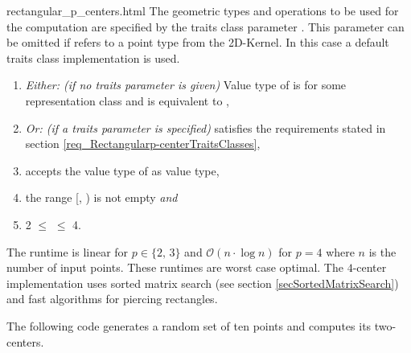 \begin{ccHtmlClassFile}{rectangular_p_centers.html}
  The geometric types and operations to be used for the computation
  are specified by the traits class parameter . This parameter
  can be omitted if  refers to a point type from
  the 2D-Kernel. In this case a default traits class implementation is
  used.

  \begin{enumerate}
  \item \textit{Either: (if no traits parameter is given)} Value type
    of  is  for some
    representation class  and  is equivalent to
    ,
  \item \textit{Or: (if a traits parameter is specified)} 
    satisfies the requirements stated in section
    \ref{req_Rectangularp-centerTraitsClasses},
  \item {} accepts the value type of
     as value type,
  \item the range [, ) is not empty \textit{and}
  \item 2 $\le$  $\le$ 4.
  \end{enumerate}
  
  \ccImplementation The runtime is linear for $p \in \{2,\,3\}$ and
  $\mathcal{O}(n \cdot \log n)$ for $p = 4$ where $n$ is the number of
  input points. These runtimes are worst case optimal. The $4$-center
  implementation uses sorted matrix search (see section
  \ref{secSortedMatrixSearch}) and fast algorithms for piercing
  rectangles\cite{sw-rpppp-96}.
  
  \ccExample The following code generates a random set of ten points
  and computes its two-centers.


\end{ccHtmlClassFile}

